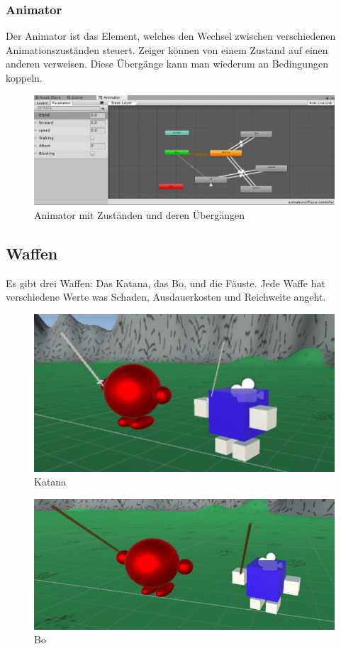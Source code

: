 \subsubsection{Animator}
Der Animator ist das Element, welches den Wechsel zwischen verschiedenen Animationszuständen steuert. Zeiger können von einem Zustand auf einen anderen verweisen. Diese Übergänge kann man wiederum an Bedingungen koppeln.
\begin{figure}[H]
\includegraphics[scale=0.67]{screenshots/animator.png}
\caption{Animator mit Zuständen und deren Übergängen}
\end{figure}

\subsection{Waffen}
\label{subsec:weapons}

Es gibt drei  Waffen: Das Katana, das Bo, und die Fäuste.
Jede Waffe hat verschiedene Werte was Schaden, Ausdauerkosten und Reichweite angeht.
\begin{figure}[H]
\includegraphics[scale=1]{screenshots/katana.png}
\caption{Katana}
\end{figure}

\begin{figure}[H]
\includegraphics[scale=1]{screenshots/bo.png}
\caption{Bo}
\end{figure}




